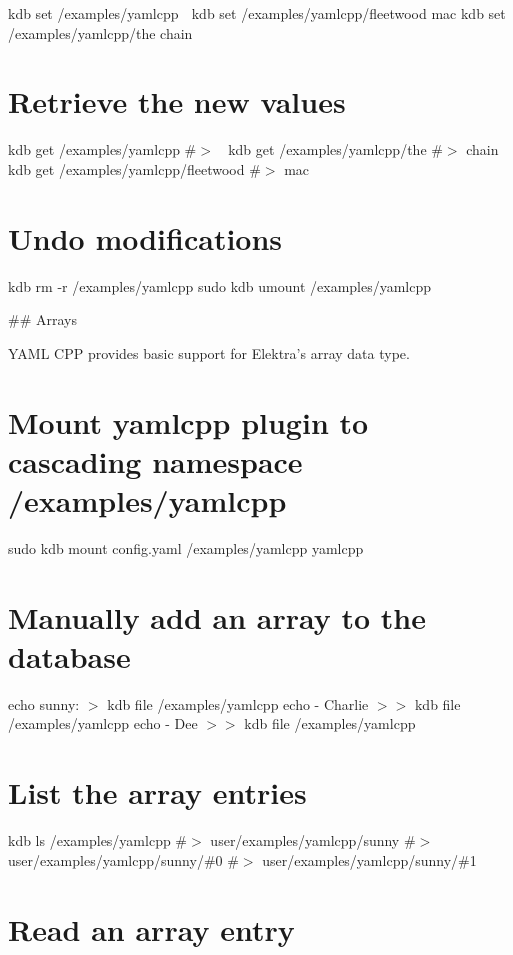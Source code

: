 kdb set /examples/yamlcpp 🎵 kdb set /examples/yamlcpp/fleetwood mac kdb set /examples/yamlcpp/the chain

\section*{Retrieve the new values}

kdb get /examples/yamlcpp \#$>$ 🎵 kdb get /examples/yamlcpp/the \#$>$ chain kdb get /examples/yamlcpp/fleetwood \#$>$ mac

\section*{Undo modifications}

kdb rm -\/r /examples/yamlcpp sudo kdb umount /examples/yamlcpp 
\begin{DoxyCode}
## Arrays

YAML CPP provides basic support for Elektra’s array data type.
\end{DoxyCode}
 \section*{Mount yamlcpp plugin to cascading namespace {\ttfamily /examples/yamlcpp}}

sudo kdb mount config.\+yaml /examples/yamlcpp yamlcpp

\section*{Manually add an array to the database}

echo \textquotesingle{}sunny\+:\textquotesingle{} $>$ {\ttfamily kdb file /examples/yamlcpp} echo \textquotesingle{} -\/ Charlie\textquotesingle{} $>$$>$ {\ttfamily kdb file /examples/yamlcpp} echo \textquotesingle{} -\/ Dee\textquotesingle{} $>$$>$ {\ttfamily kdb file /examples/yamlcpp}

\section*{List the array entries}

kdb ls /examples/yamlcpp \#$>$ user/examples/yamlcpp/sunny \#$>$ user/examples/yamlcpp/sunny/\#0 \#$>$ user/examples/yamlcpp/sunny/\#1

\section*{Read an array entry}

